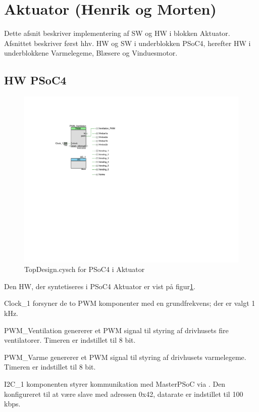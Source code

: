 \section{Aktuator (Henrik og Morten)}

Dette afsnit beskriver implementering af SW og HW i blokken Aktuator. Afsnittet beskriver først hhv. HW og SW i underblokken PSoC4, herefter HW i underblokkene Varmelegeme, Blæsere og Vinduesmotor.

\subsection{HW PSoC4}
\begin{figure}[h]
\centering 
\includegraphics[width={\textwidth-6cm}, trim = 100 250 500 110, clip=true] {../fig/TopDesign_Aktuator.pdf}
\caption{TopDesign.cysch for PSoC4 i Aktuator}
\label{fig:topdesign_aktuator}
\end{figure}

Den HW, der syntetiseres i PSoC4 Aktuator er vist på figur\ref{fig:topdesign_aktuator}. 

Clock\_1 forsyner de to PWM komponenter med en grundfrekvens; der er valgt 1 kHz.

PWM\_Ventilation genererer et PWM signal til styring af drivhusets fire ventilatorer. Timeren er indstillet til 8 bit. 

PWM\_Varme genererer et PWM signal til styring af drivhusets varmelegeme. Timeren er indstillet til 8 bit. 

I2C\_1 komponenten styrer kommunikation med MasterPSoC via \IIC. 
Den konfigureret til at være slave med adressen 0x42, datarate er indstillet til 100 kbps.

